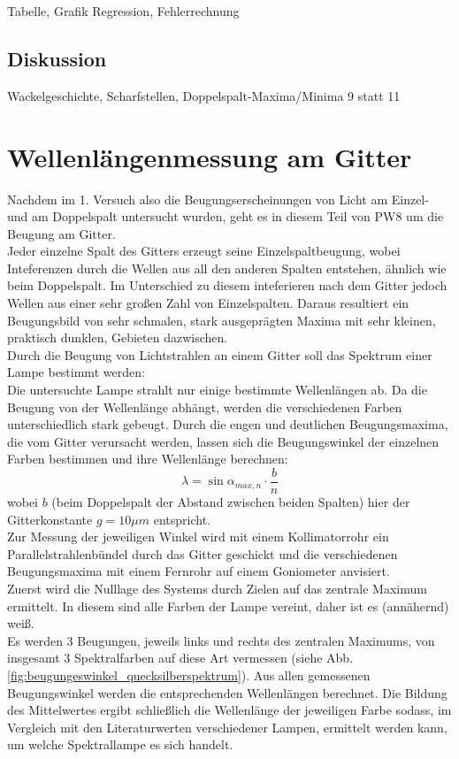 \documentclass[12pt,a4paper]{article}
\begin{document}
\begin{multicols}{2}

Tabelle, Grafik Regression, Fehlerrechnung

\subsection{Diskussion}

Wackelgeschichte, Scharfstellen, Doppelspalt-Maxima/Minima 9 statt 11

\section{Wellenlängenmessung am Gitter}

Nachdem im 1. Versuch also die Beugungserscheinungen von Licht am Einzel- und am Doppelspalt
untersucht wurden, geht es in diesem Teil von PW8 um die Beugung am Gitter.\\
Jeder einzelne Spalt des Gitters erzeugt seine Einzelspaltbeugung, wobei Inteferenzen durch die Wellen aus all den anderen Spalten entstehen, ähnlich wie beim Doppelspalt. Im Unterschied zu diesem inteferieren nach dem Gitter jedoch Wellen aus einer sehr großen Zahl von Einzelspalten.
Daraus resultiert ein Beugungsbild von sehr schmalen, stark ausgeprägten Maxima mit sehr kleinen, praktisch dunklen, Gebieten dazwischen.\\
Durch die Beugung von Lichtstrahlen an einem Gitter soll das Spektrum einer Lampe bestimmt werden:\\
Die untersuchte Lampe strahlt nur einige bestimmte Wellenlängen ab. Da die Beugung von der Wellenlänge abhängt, werden die verschiedenen Farben unterschiedlich stark gebeugt. Durch die engen und deutlichen Beugungsmaxima, die vom Gitter verursacht werden, lassen sich die Beugungswinkel der einzelnen Farben bestimmen und ihre Wellenlänge berechnen:
$$\lambda = \sin{\alpha_{max,n}}\cdot \frac{b}{n}$$
wobei $b$ (beim Doppelspalt der Abstand zwischen beiden Spalten) hier der Gitterkonstante $g=10 \mu m$ entspricht.\\
Zur Messung der jeweiligen Winkel wird mit einem Kollimatorrohr ein Parallelstrahlenbündel durch das Gitter geschickt und die verschiedenen Beugungsmaxima mit einem Fernrohr auf einem Goniometer anvisiert.\\
Zuerst wird die Nulllage des Systems durch Zielen auf das zentrale Maximum ermittelt. In diesem sind alle Farben der Lampe vereint, daher ist es (annähernd) weiß.\\
Es werden 3 Beugungen, jeweils links und rechts des zentralen Maximums, von insgesamt 3 Spektralfarben auf diese Art vermessen (siehe Abb. \ref{fig:beugungeswinkel_quecksilberspektrum}). Aus allen gemessenen Beugungswinkel werden die entsprechenden Wellenlängen berechnet. Die Bildung des Mittelwertes ergibt schließlich die Wellenlänge der jeweiligen Farbe sodass, im Vergleich mit den Literaturwerten verschiedener Lampen, ermittelt werden kann, um welche Spektrallampe es sich handelt.


\end{multicols}
\end{document}
